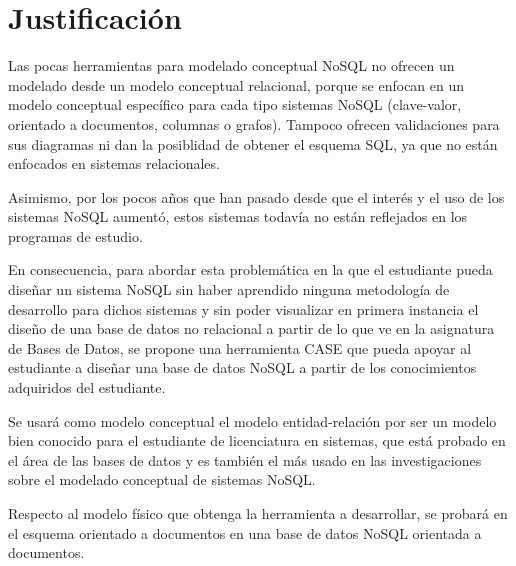 \section{Justificación}

Las pocas herramientas para modelado conceptual NoSQL no ofrecen un modelado desde un modelo conceptual relacional, porque se enfocan en un modelo conceptual específico para cada tipo sistemas NoSQL (clave-valor, orientado a documentos, columnas o grafos). Tampoco ofrecen validaciones para sus diagramas ni dan la posiblidad de obtener el esquema SQL, ya que no están enfocados en sistemas relacionales.


Asimismo, por los pocos años que han pasado desde que el interés y el uso de los sistemas NoSQL aumentó, estos sistemas todavía no están reflejados en los programas de estudio.


En consecuencia, para abordar esta problemática en la que el estudiante pueda diseñar un sistema NoSQL sin haber aprendido ninguna metodología de desarrollo para dichos sistemas y sin poder visualizar en primera instancia el diseño de una base de datos no relacional a partir de lo que ve en la asignatura de Bases de Datos, se propone una herramienta CASE que pueda apoyar al estudiante a diseñar una base de datos NoSQL a partir de los conocimientos adquiridos del estudiante.


Se usará como modelo conceptual el modelo entidad-relación por ser un modelo bien conocido para el estudiante de licenciatura en sistemas, que está probado en el área de las bases de datos y es también el más usado en las investigaciones sobre el modelado conceptual de sistemas NoSQL.


Respecto al modelo físico que obtenga la herramienta a desarrollar, se probará en el esquema orientado a documentos en una base de datos NoSQL orientada a documentos.

